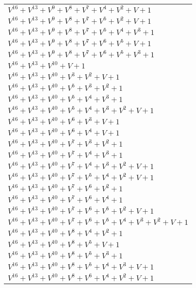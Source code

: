 \documentclass[12pt]{article}
\begin{document}
\begin{adjustwidth}{-4cm}{}
\begin{center}
\begin{longtable}{|l|}
$V^{16}  +V^{13}  +V^{9}  +V^{8}  +V^{7}  +V^{4}  +V^{2}  + V + 1$ \\
$V^{16}  +V^{13}  +V^{9}  +V^{8}  +V^{7}  +V^{5}  +V^{2}  + V + 1$ \\
$V^{16}  +V^{13}  +V^{9}  +V^{8}  +V^{7}  +V^{5}  +V^{4}  +V^{3}  + 1$ \\
$V^{16}  +V^{13}  +V^{9}  +V^{8}  +V^{7}  +V^{6}  +V^{5}  + V + 1$ \\
$V^{16}  +V^{13}  +V^{9}  +V^{8}  +V^{7}  +V^{6}  +V^{5}  +V^{3}  + 1$ \\
$V^{16}  +V^{13}  +V^{10}  + V + 1$ \\
$V^{16}  +V^{13}  +V^{10}  +V^{3}  +V^{2}  + V + 1$ \\
$V^{16}  +V^{13}  +V^{10}  +V^{5}  +V^{3}  +V^{2}  + 1$ \\
$V^{16}  +V^{13}  +V^{10}  +V^{5}  +V^{4}  +V^{3}  + 1$ \\
$V^{16}  +V^{13}  +V^{10}  +V^{5}  +V^{4}  +V^{3}  +V^{2}  + V + 1$ \\
$V^{16}  +V^{13}  +V^{10}  +V^{6}  +V^{3}  + V + 1$ \\
$V^{16}  +V^{13}  +V^{10}  +V^{6}  +V^{4}  + V + 1$ \\
$V^{16}  +V^{13}  +V^{10}  +V^{7}  +V^{3}  +V^{2}  + 1$ \\
$V^{16}  +V^{13}  +V^{10}  +V^{7}  +V^{4}  +V^{3}  + 1$ \\
$V^{16}  +V^{13}  +V^{10}  +V^{7}  +V^{4}  +V^{3}  +V^{2}  + V + 1$ \\
$V^{16}  +V^{13}  +V^{10}  +V^{7}  +V^{5}  +V^{4}  +V^{2}  + V + 1$ \\
$V^{16}  +V^{13}  +V^{10}  +V^{7}  +V^{6}  +V^{2}  + 1$ \\
$V^{16}  +V^{13}  +V^{10}  +V^{7}  +V^{6}  +V^{4}  + 1$ \\
$V^{16}  +V^{13}  +V^{10}  +V^{7}  +V^{6}  +V^{5}  +V^{2}  + V + 1$ \\
$V^{16}  +V^{13}  +V^{10}  +V^{7}  +V^{6}  +V^{5}  +V^{4}  +V^{3}  +V^{2}  + V + 1$ \\
$V^{16}  +V^{13}  +V^{10}  +V^{8}  +V^{4}  +V^{2}  + 1$ \\
$V^{16}  +V^{13}  +V^{10}  +V^{8}  +V^{5}  + V + 1$ \\
$V^{16}  +V^{13}  +V^{10}  +V^{8}  +V^{5}  +V^{3}  + 1$ \\
$V^{16}  +V^{13}  +V^{10}  +V^{8}  +V^{5}  +V^{4}  +V^{3}  + V + 1$ \\
$V^{16}  +V^{13}  +V^{10}  +V^{8}  +V^{6}  +V^{4}  +V^{2}  + V + 1$ \\

\end{longtable}
\end{center}
\end{adjustwidth}
\end{document}
